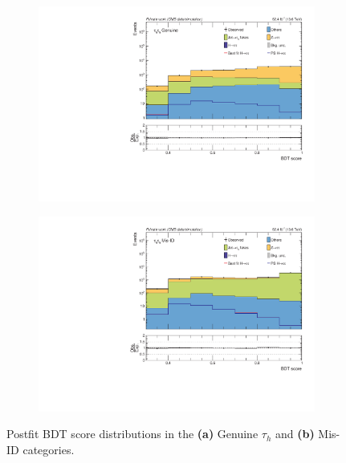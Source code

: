 \begin{figure}[!htbp]
        \centering
        \begin{subfigure}[b]{0.7\textwidth}
            \centering
            \includegraphics[width=\textwidth]{Figures/Chapter7/postfit/htt_tt_1_13p6TeV.pdf}
            \caption{}
        \end{subfigure}
        \begin{subfigure}[b]{0.7\textwidth}
            \centering
            \includegraphics[width=\textwidth]{Figures/Chapter7/postfit/htt_tt_2_13p6TeV.pdf}
            \caption{}
        \end{subfigure}
    \caption{Postfit BDT score distributions in the \textbf{(a)} Genuine $\tau_h$ and \textbf{(b)} Mis-ID categories.}
    \label{Figure:Chapter7_Postfit_BDT}
\end{figure}

